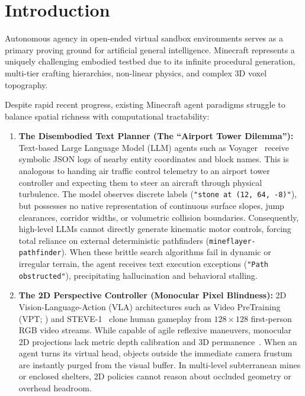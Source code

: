 \documentclass[10pt,twocolumn,letterpaper]{article}
\begin{document}
\section{Introduction}

Autonomous agency in open-ended virtual sandbox environments serves as a primary proving ground for artificial general intelligence. Minecraft represents a uniquely challenging embodied testbed due to its infinite procedural generation, multi-tier crafting hierarchies, non-linear physics, and complex 3D voxel topography.

Despite rapid recent progress, existing Minecraft agent paradigms struggle to balance spatial richness with computational tractability:

\begin{enumerate}[leftmargin=*]
    \item \textbf{The Disembodied Text Planner (The ``Airport Tower Dilemma''):} Text-based Large Language Model (LLM) agents such as Voyager~\cite{wang2023voyager} receive symbolic JSON logs of nearby entity coordinates and block names. This is analogous to handing air traffic control telemetry to an airport tower controller and expecting them to steer an aircraft through physical turbulence. The model observes discrete labels (\texttt{"stone at (12, 64, -8)"}), but possesses no native representation of continuous surface slopes, jump clearances, corridor widths, or volumetric collision boundaries. Consequently, high-level LLMs cannot directly generate kinematic motor controls, forcing total reliance on external deterministic pathfinders (\texttt{mineflayer-pathfinder}). When these brittle search algorithms fail in dynamic or irregular terrain, the agent receives text execution exceptions (\texttt{"Path obstructed"}), precipitating hallucination and behavioral stalling.

    \item \textbf{The 2D Perspective Controller (Monocular Pixel Blindness):} 2D Vision-Language-Action (VLA) architectures such as Video PreTraining (VPT; \cite{baker2022video}) and STEVE-1~\cite{lifshitz2023steve1} clone human gameplay from $128 \times 128$ first-person RGB video streams. While capable of agile reflexive maneuvers, monocular 2D projections lack metric depth calibration and 3D permanence~\cite{chen2024spatialvlm}. When an agent turns its virtual head, objects outside the immediate camera frustum are instantly purged from the visual buffer. In multi-level subterranean mines or enclosed shelters, 2D policies cannot reason about occluded geometry or overhead headroom.


\end{enumerate}
\end{document}

